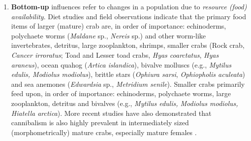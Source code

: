 \documentclass[11pt]{article}
\begin{document}
\begin{enumerate}

%

\item
  \textbf{Bottom-up} influences refer to changes in a population due to \emph{resource (food) availability}. Diet studies and field observations \citep{Hooper1986, Bundy2004} indicate that the primary food items of larger (mature) crab are, in order of importance: echinoderms, polychaete worms (\textit{Maldane} sp., \textit{Nereis} sp.) and other worm-like invertebrates, detritus, large zooplankton, shrimps, smaller crabs (Rock crab, \textit{Cancer irroratus}; Toad and Lesser toad crabs, \textit{Hyas coarctatus}, \textit{Hyas araneus}), ocean quahog (\textit{Artica islandica}), bivalve molluscs (e.g., \textit{Mytilus edulis, Modiolus modiolus}), brittle stars (\textit{Ophiura sarsi}, \textit{Ophiopholis aculeata}) and sea anemones (\textit{Edwardsia} sp., \textit{Metridium senile}). Smaller crabs primarily feed upon, in order of importance: echinoderms, polychaete worms, large zooplankton, detritus and bivalves (e.g., \textit{Mytilus edulis, Modiolus modiolus, Hiatella arctica}). More recent studies have also demonstrated that cannibalism is also highly prevalent in intermediately sized (morphometrically) mature crabs, especially mature females \citep{Sainte-Marie2002, Squires2003}. 
  

\end{enumerate}
\end{document}

